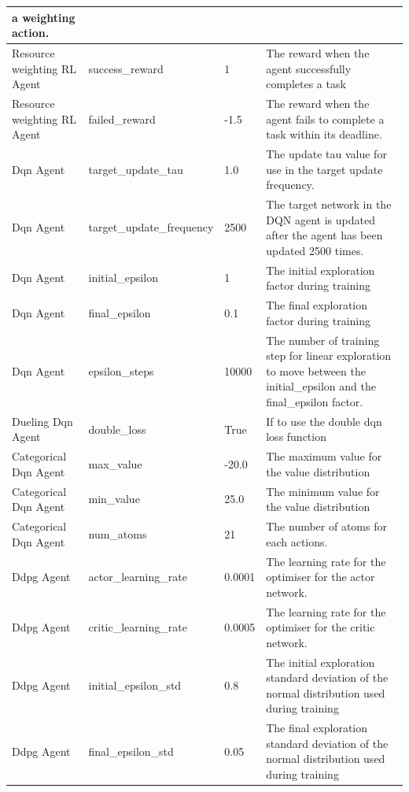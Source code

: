 \begin{longtable}{|p{3.5cm}|p{5cm}|p{3.5cm}|p{3.5cm}|}
            a weighting action. \\ \hline
        Resource weighting RL Agent & success\_reward & 1 & The reward when the agent successfully completes a task
            \\ \hline
        Resource weighting RL Agent & failed\_reward & -1.5 & The reward when the agent fails to complete a task within
            its deadline. \\ \hline \hline
        Dqn Agent & target\_update\_tau & 1.0 & The update tau value for use in the target update frequency. \\ \hline
        Dqn Agent & target\_update\_frequency & 2500 & The target network in the DQN agent is updated after the agent
            has been updated 2500 times. \\ \hline
        Dqn Agent & initial\_epsilon & 1 & The initial exploration factor during training \\ \hline
        Dqn Agent & final\_epsilon & 0.1 & The final exploration factor during training \\ \hline
        Dqn Agent & epsilon\_steps & 10000 & The number of training step for linear exploration to move between the
            initial\_epsilon and the final\_epsilon factor. \\ \hline
        Dueling Dqn Agent & double\_loss & True & If to use the double dqn loss function \\ \hline \hline
        Categorical Dqn Agent & max\_value & -20.0 & The maximum value for the value distribution \\ \hline
        Categorical Dqn Agent & min\_value & 25.0 & The minimum value for the value distribution \\ \hline
        Categorical Dqn Agent & num\_atoms & 21 & The number of atoms for each actions. \\ \hline \hline
        Ddpg Agent & actor\_learning\_rate & 0.0001 & The learning rate for the optimiser for the actor network. \\ \hline
        Ddpg Agent & critic\_learning\_rate & 0.0005 & The learning rate for the optimiser for the critic network. \\ \hline
        Ddpg Agent & initial\_epsilon\_std & 0.8 & The initial exploration standard deviation of the normal distribution
            used  during training \\ \hline
        Ddpg Agent & final\_epsilon\_std & 0.05 & The final exploration standard deviation of the normal distribution
            used  during training \\ \hline

\end{longtable}
